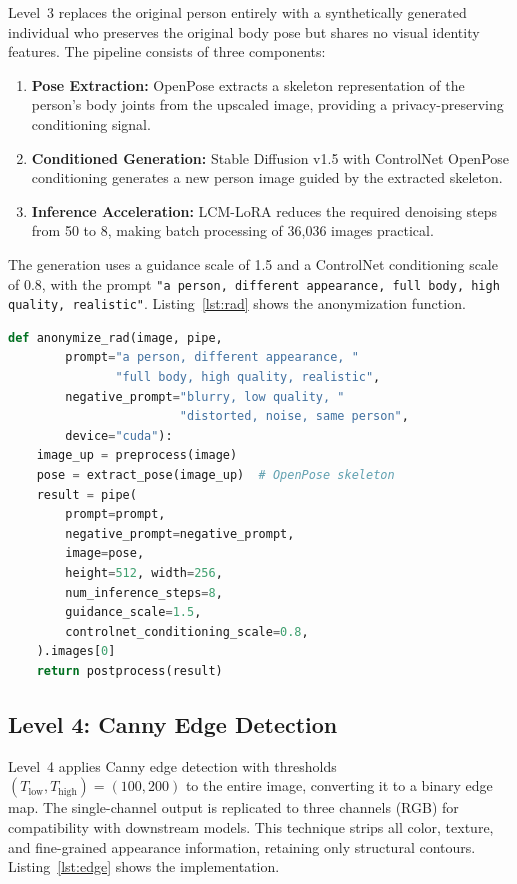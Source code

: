 Level~3 replaces the original person entirely with a synthetically generated individual who preserves the original body pose but shares no visual identity features. The pipeline consists of three components:

\begin{enumerate}[noitemsep]
    \item \textbf{Pose Extraction:} OpenPose \cite{cao2017openpose} extracts a skeleton representation of the person's body joints from the upscaled image, providing a privacy-preserving conditioning signal.
    \item \textbf{Conditioned Generation:} Stable Diffusion v1.5 \cite{rombach2022ldm} with ControlNet OpenPose conditioning \cite{zhang2023controlnet} generates a new person image guided by the extracted skeleton.
    \item \textbf{Inference Acceleration:} LCM-LoRA \cite{luo2023lcm} reduces the required denoising steps from 50 to 8, making batch processing of 36,036 images practical.
\end{enumerate}

The generation uses a guidance scale of 1.5 and a ControlNet conditioning scale of 0.8, with the prompt \texttt{"a person, different appearance, full body, high quality, realistic"}. Listing~\ref{lst:rad} shows the anonymization function.

\begin{lstlisting}[language=Python, caption={Level~3 RAD anonymization (\texttt{rad\_pipeline.py}).}, label=lst:rad]
def anonymize_rad(image, pipe,
        prompt="a person, different appearance, "
               "full body, high quality, realistic",
        negative_prompt="blurry, low quality, "
                        "distorted, noise, same person",
        device="cuda"):
    image_up = preprocess(image)
    pose = extract_pose(image_up)  # OpenPose skeleton
    result = pipe(
        prompt=prompt,
        negative_prompt=negative_prompt,
        image=pose,
        height=512, width=256,
        num_inference_steps=8,
        guidance_scale=1.5,
        controlnet_conditioning_scale=0.8,
    ).images[0]
    return postprocess(result)
\end{lstlisting}

\subsection{Level 4: Canny Edge Detection}

Level~4 applies Canny edge detection \cite{canny1986edge} with thresholds $(T_\text{low}, T_\text{high}) = (100, 200)$ to the entire image, converting it to a binary edge map. The single-channel output is replicated to three channels (RGB) for compatibility with downstream models. This technique strips all color, texture, and fine-grained appearance information, retaining only structural contours. Listing~\ref{lst:edge} shows the implementation.


